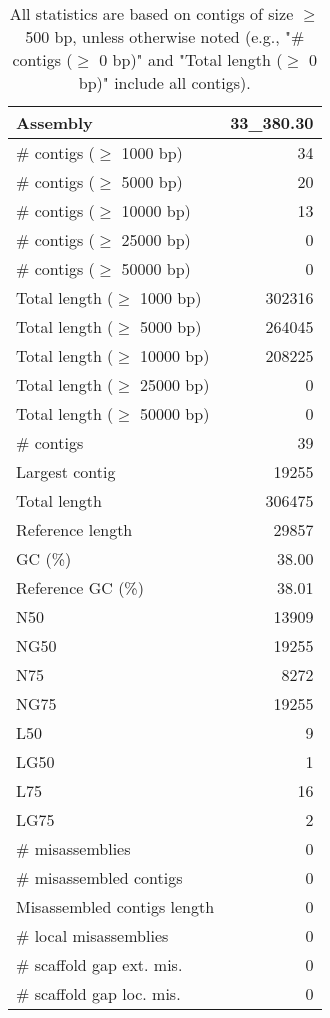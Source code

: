 \documentclass[12pt,a4paper]{article}
\begin{document}
\begin{table}[ht]
\begin{center}
\caption{All statistics are based on contigs of size $\geq$ 500 bp, unless otherwise noted (e.g., "\# contigs ($\geq$ 0 bp)" and "Total length ($\geq$ 0 bp)" include all contigs).}
\begin{tabular}{|l*{1}{|r}|}
\hline
Assembly & 33\_380.30 \\ \hline
\# contigs ($\geq$ 1000 bp) & 34 \\ \hline
\# contigs ($\geq$ 5000 bp) & 20 \\ \hline
\# contigs ($\geq$ 10000 bp) & 13 \\ \hline
\# contigs ($\geq$ 25000 bp) & 0 \\ \hline
\# contigs ($\geq$ 50000 bp) & 0 \\ \hline
Total length ($\geq$ 1000 bp) & 302316 \\ \hline
Total length ($\geq$ 5000 bp) & 264045 \\ \hline
Total length ($\geq$ 10000 bp) & 208225 \\ \hline
Total length ($\geq$ 25000 bp) & 0 \\ \hline
Total length ($\geq$ 50000 bp) & 0 \\ \hline
\# contigs & 39 \\ \hline
Largest contig & 19255 \\ \hline
Total length & 306475 \\ \hline
Reference length & 29857 \\ \hline
GC (\%) & 38.00 \\ \hline
Reference GC (\%) & 38.01 \\ \hline
N50 & 13909 \\ \hline
NG50 & 19255 \\ \hline
N75 & 8272 \\ \hline
NG75 & 19255 \\ \hline
L50 & 9 \\ \hline
LG50 & 1 \\ \hline
L75 & 16 \\ \hline
LG75 & 2 \\ \hline
\# misassemblies & 0 \\ \hline
\# misassembled contigs & 0 \\ \hline
Misassembled contigs length & 0 \\ \hline
\# local misassemblies & 0 \\ \hline
\# scaffold gap ext. mis. & 0 \\ \hline
\# scaffold gap loc. mis. & 0 \\ \hline

\end{tabular}
\end{center}
\end{table}
\end{document}

